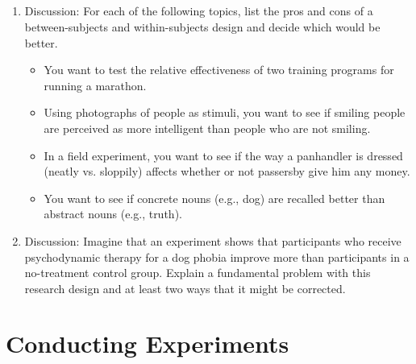 \subsection{}
\begin{fullwidth}
\begin{enumerate}
\item  Discussion: For each of the following topics, list the pros and cons of a between-subjects and within-subjects design and decide which would be better.
	\begin{itemize}
	\item You want to test the relative effectiveness of two training programs for running a marathon.
	\item Using photographs of people as stimuli, you want to see if smiling people are perceived as more intelligent than people who are not smiling.
	\item In a field experiment, you want to see if the way a panhandler is dressed (neatly vs. sloppily) affects whether or not passersby give him any money.
	\item You want to see if concrete nouns (e.g., dog) are recalled better than abstract nouns (e.g., truth).
  
	\end{itemize}
\item Discussion: Imagine that an experiment shows that participants who receive psychodynamic therapy for a dog phobia improve more than participants in a no-treatment control group. Explain a fundamental problem with this research design and at least two ways that it might be corrected.
\end{enumerate}
\end{fullwidth}  

\newpage
\section{Conducting Experiments} 



